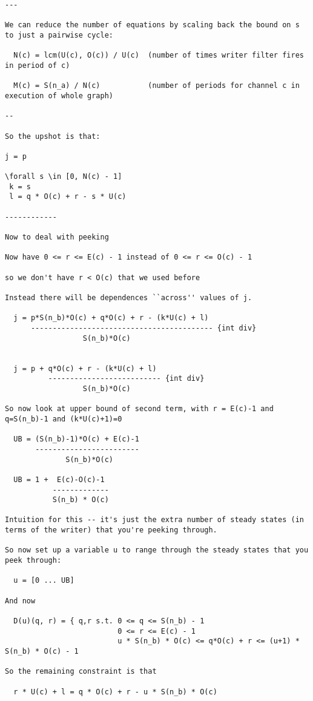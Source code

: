 \begin{verbatim}
---

We can reduce the number of equations by scaling back the bound on s to just a pairwise cycle:  

  N(c) = lcm(U(c), O(c)) / U(c)  (number of times writer filter fires in period of c)

  M(c) = S(n_a) / N(c)           (number of periods for channel c in execution of whole graph)

--

So the upshot is that:

j = p

\forall s \in [0, N(c) - 1]
 k = s
 l = q * O(c) + r - s * U(c)

------------

Now to deal with peeking

Now have 0 <= r <= E(c) - 1 instead of 0 <= r <= O(c) - 1

so we don't have r < O(c) that we used before

Instead there will be dependences ``across'' values of j.

  j = p*S(n_b)*O(c) + q*O(c) + r - (k*U(c) + l)            
      ------------------------------------------ {int div} 
                  S(n_b)*O(c)


  j = p + q*O(c) + r - (k*U(c) + l)
          -------------------------- {int div} 
                  S(n_b)*O(c)

So now look at upper bound of second term, with r = E(c)-1 and q=S(n_b)-1 and (k*U(c)+1)=0

  UB = (S(n_b)-1)*O(c) + E(c)-1
       ------------------------
              S(n_b)*O(c)

  UB = 1 +  E(c)-O(c)-1
           -------------
           S(n_b) * O(c)

Intuition for this -- it's just the extra number of steady states (in
terms of the writer) that you're peeking through.

So now set up a variable u to range through the steady states that you
peek through:

  u = [0 ... UB]

And now 

  D(u)(q, r) = { q,r s.t. 0 <= q <= S(n_b) - 1
                          0 <= r <= E(c) - 1
                          u * S(n_b) * O(c) <= q*O(c) + r <= (u+1) * S(n_b) * O(c) - 1

So the remaining constraint is that

  r * U(c) + l = q * O(c) + r - u * S(n_b) * O(c)


\end{verbatim}
